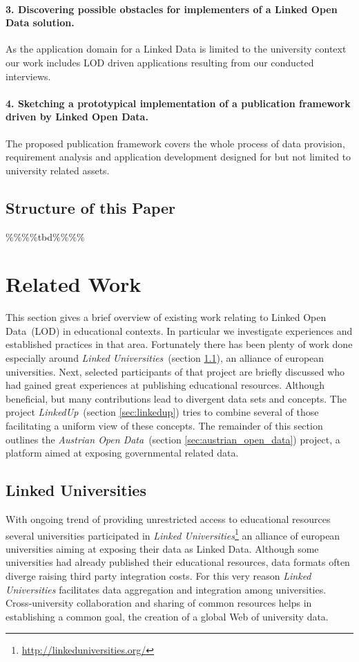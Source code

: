 \documentclass{article}
\begin{document}
\paragraph{3. Discovering possible obstacles for implementers of a Linked Open Data solution.}
As the application domain for a Linked Data is limited to the university context our work includes LOD driven applications resulting from our conducted interviews.
\paragraph{4. Sketching a prototypical implementation of a publication framework driven by Linked Open Data.}
The proposed publication framework covers the whole process of data provision, requirement analysis and application development designed for but not limited to university related assets.  
\subsection{Structure of this Paper}
\%\%\%\%tbd\%\%\%\%

\section{Related Work}
This section gives a brief overview of existing work relating to Linked Open Data~(LOD) in educational contexts. In particular we investigate experiences and established practices in that area. Fortunately there has been plenty of work done especially around \textit{Linked Universities}~(section \ref{sec:linked_universities}), an alliance of european universities. Next, selected participants of that project are briefly discussed who had gained great experiences at publishing educational resources. Although beneficial, but many contributions lead to divergent data sets and concepts. The project \textit{LinkedUp}~(section \ref{sec:linkedup}) tries to combine several of those facilitating a uniform view of these concepts. The remainder of this section outlines the \textit{Austrian Open Data}~(section \ref{sec:austrian_open_data}) project, a platform aimed at exposing governmental related data. 
\subsection{Linked Universities}
\label{sec:linked_universities}
With ongoing trend of providing unrestricted access to educational resources several universities participated in \textit{Linked Universities}\footnote{\url{http://linkeduniversities.org/}} an alliance of european universities aiming at exposing their data as Linked Data. Although some universities had already published their educational resources, data formats often diverge raising third party integration costs. For this very reason \textit{Linked Universities} facilitates data aggregation and integration among universities. Cross-university collaboration and sharing of common resources helps in establishing a common goal, the creation of a global Web of university data. 
\end{document}

